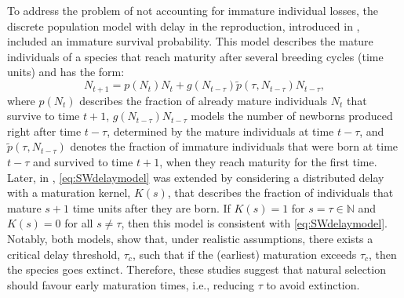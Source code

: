 \documentclass{article}
\numberwithin{theorem}{section}
\begin{document}
To address the problem of not accounting for immature individual losses, the discrete population model with delay in the reproduction, introduced in \cite{StWodelay2}, included an immature survival probability. This model describes the mature individuals of a species that reach maturity after several breeding cycles (time units) and has the form:
\begin{equation}\label{eq:SWdelaymodel}
    N_{t+1}=p(N_t)N_t + g(N_{t-\tau})\widetilde{p}(\tau,N_{t-\tau})N_{t-\tau},
\end{equation}
where $p(N_t)$ describes the fraction of already mature individuals $N_t$ that survive to time $t+1$, $g(N_{t-\tau}){N_{t-\tau}}$ models the number of newborns produced right after time $t-\tau$, determined by the mature individuals at time $t-\tau$, and $\widetilde{p}(\tau,N_{t-\tau})$ denotes the fraction of immature individuals that were born at time $t-\tau$ and survived to time $t+1$, when they reach maturity for the first time. Later, in \cite{StWodelay3}, \eqref{eq:SWdelaymodel} was extended by considering a distributed delay with a maturation kernel, $K(s)$, that describes the fraction of individuals that mature $s+1$ time units after they are born. If $K(s)=1$ for $s=\tau\in \mathbb{N}$ and $K(s)=0$ for all $s\neq \tau$, then this model is consistent with \eqref{eq:SWdelaymodel}. Notably, both models, \cite{StWodelay2,StWodelay3} show that, under realistic assumptions, there exists a critical delay threshold, $\tau_c$, such that if the (earliest) maturation exceeds $\tau_c$, then the species goes extinct. Therefore, these studies suggest that natural selection should favour early maturation times, i.e., reducing $\tau$ to avoid extinction. 
\end{document}
